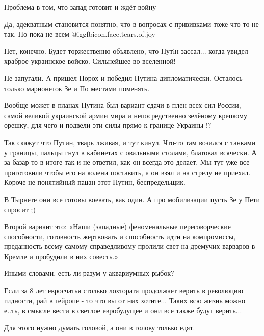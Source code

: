 \begin{multicols}{2}
Проблема в том, что запад готовит и ждёт войну


Да, адекватным становится понятно, что в вопросах с прививками тоже что-то не
так. Но пока не всем @igg{fbicon.face.tears.of.joy} 


Нет, конечно. Будет торжественно объявлено, что Путiн зассал... когда увидел
храброе украинское войско. Сильнейшее во вселенной!


Не запугали. А пришел Порох и победил Путина дипломатически. Осталось только
марионеток Зе и По местами поменять.


Вообще может в планах Путина был вариант сдачи в плен всех сил России, самой
великой украинской армии мира и непосредственно зелёному крепкому орешку, для
чего и подвели эти силы прямо к границе Украины !?


Так скажут что Путин, тварь  лживая, и тут кинул. Что-то там возился с танками
у границы, пальцы гнул в кабинетах с овальными столами, блатовал всячески. А за
базар то в итоге так и не ответил, как он всегда это делает. Мы тут уже все
приготовили  чтобы его на колени поставить, а он взял и на стрелу не приехал.
Короче не  понятийный пацан этот Путин, беспредельщик.


В Тырнете они все готовы воевать, как один. А про мобилизации пусть Зе у Пети спросит ;)


Второй вариант это: «Наши (западные) феноменальные переговорческие способности,
готовность жертвовать и способность идти на компромиссы, преданность всему
самому справедливому пролили свет на дремучих варваров в Кремле и пробудили в
них совесть.»


Иными словами, есть ли разум у аквариумных рыбок?


Если за 8 лет евросчатья столько лохтората продолжает верить в революцию
гидности, рай в гейропе - то что вы от них хотите... Таких всю жизнь можно
е..ть, в смысле вести в светлое евробудущее и они все также будут верить...


Для этого нужно думать  головой, а они в голову только едят.


\end{multicols}
